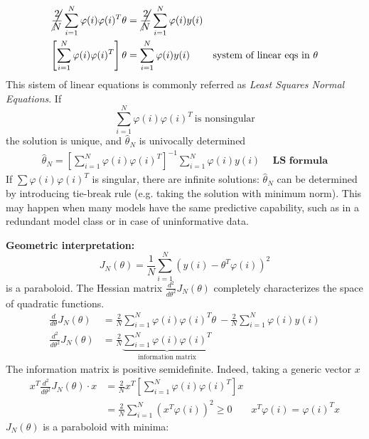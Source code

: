 \begin{equation*}
\begin{aligned}
\cancel{\frac{2}{N}}\sum _{i=1}^{N} \varphi ( i) \varphi ( i)^{T} \theta  & =\cancel{\frac{2}{N}}\sum _{i=1}^{N} \varphi ( i) y( i) & \\
\left[\sum _{i=1}^{N} \varphi ( i) \varphi ( i)^{T}\right] \theta  & =\sum _{i=1}^{N} \varphi ( i) y( i) & \text{system of linear eqs in} \ \theta 
\end{aligned}
\end{equation*}
This sistem of linear equations is commonly referred as \textit{Least Squares Normal Equations}. If 
\begin{equation*}
\sum _{i=1}^{N} \varphi ( i) \varphi ( i)^{T} \ \text{is nonsingular}
\end{equation*}
the solution is unique, and $ \hat{\theta }_{N}$ is univocally determined
\begin{equation*}
\boxed{\begin{aligned}
\hat{\theta }_{N} =\left[\sum _{i=1}^{N} \varphi ( i) \varphi ( i)^{T}\right]^{-1}\sum _{i=1}^{N} \varphi ( i) y( i) & \ \ \mathbf{\text{LS formula}}
\end{aligned}}
\end{equation*}
If $ \sum \varphi ( i) \varphi ( i)^{T}$ is singular, there are infinite solutions: $ \hat{\theta }_{N}$ can be determined by introducing tie-break rule (e.g. taking the solution with minimum norm). This may happen when many models have the same predictive capability, such as in a redundant model class or in case of uninformative data.

\textbf{Geometric interpretation:}
\begin{equation*}
J_{N}( \theta ) =\frac{1}{N}\sum _{i=1}^{N}\left( y( i) -\theta ^{T} \varphi ( i)\right)^{2}
\end{equation*}
is a paraboloid. The Hessian matrix $ \frac{d^{2}}{d\theta ^{2}} J_{N}( \theta )$ completely characterizes the space of quadratic functions.
\begin{equation*}
\begin{aligned}
\frac{d}{d\theta } J_{N}( \theta ) & =\frac{2}{N}\sum _{i=1}^{N} \varphi ( i) \varphi ( i)^{T} \theta \ -\frac{2}{N}\sum _{i=1}^{N} \varphi ( i) y( i)\\
\frac{d^{2}}{d\theta ^{2}} J_{N}( \theta ) & =\frac{2}{N}\underbrace{\sum _{i=1}^{N} \varphi ( i) \varphi ( i)^{T}}_{\text{information matrix}}
\end{aligned}
\end{equation*}
The information matrix is positive semidefinite. Indeed, taking a generic vector $ x$
\begin{equation*}
\begin{aligned}
x^{T}\frac{d^{2}}{d\theta ^{2}} J_{N}( \theta ) \cdotp x & =\frac{2}{N} x^{T}\left[\sum _{i=1}^{N} \varphi ( i) \varphi ( i)^{T}\right] x & \\
 & =\frac{2}{N}\sum _{i=1}^{N}\left( x^{T} \varphi ( i)\right)^{2} \geq 0 & x^{T} \varphi ( i) =\varphi ( i)^{T} x
\end{aligned}
\end{equation*}
$ J_{N}( \theta )$ is a paraboloid with minima:

